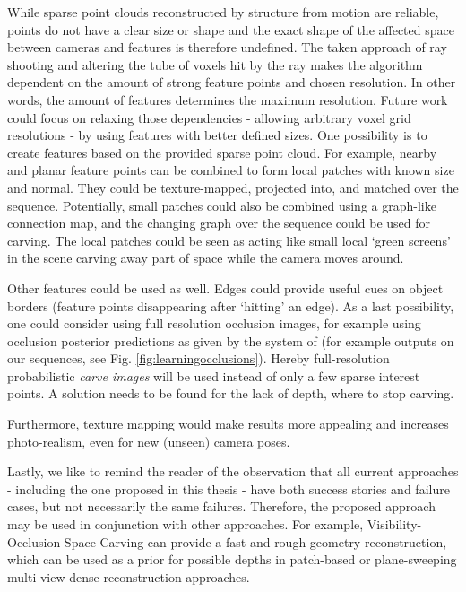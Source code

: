 While sparse point clouds reconstructed by structure from motion are reliable, points do not have a clear size or shape and the exact shape of the affected space between cameras and features is therefore undefined. The taken approach of ray shooting and altering the tube of voxels hit by the ray makes the algorithm dependent on the amount of strong feature points and chosen resolution. In other words, the amount of features determines the maximum resolution. Future work could focus on relaxing those dependencies - allowing arbitrary voxel grid resolutions - by using features with better defined sizes. One possibility is to create features based on the provided sparse point cloud. For example, nearby and planar feature points can be combined to form local patches with known size and normal. They could be texture-mapped, projected into, and matched over the sequence. Potentially, small patches could also be combined using a graph-like connection map, and the changing graph over the sequence could be used for carving. The local patches could be seen as acting like small local `green screens' in the scene carving away part of space while the camera moves around.

Other features could be used as well. Edges could provide useful cues on object borders (\eg feature points disappearing after `hitting' an edge). As a last possibility, one could consider using full resolution occlusion images, for example using occlusion posterior predictions as given by the system of  (for example outputs on our sequences, see Fig. \ref{fig:learningocclusions}). Hereby full-resolution probabilistic \emph{carve images} will be used instead of only a few sparse interest points. A solution needs to be found for the lack of depth, \ie where to stop carving.

Furthermore, texture mapping would make results more appealing and increases photo-realism, even for new (unseen) camera poses.

Lastly, we like to remind the reader of the observation that all current approaches - including the one proposed in this thesis - have both success stories and failure cases, but not necessarily the same failures. Therefore, the proposed approach may be used in conjunction with other approaches. For example, Visibility-Occlusion Space Carving can provide a fast and rough geometry reconstruction, which can be used as a prior for possible depths in patch-based or plane-sweeping multi-view dense reconstruction approaches.

